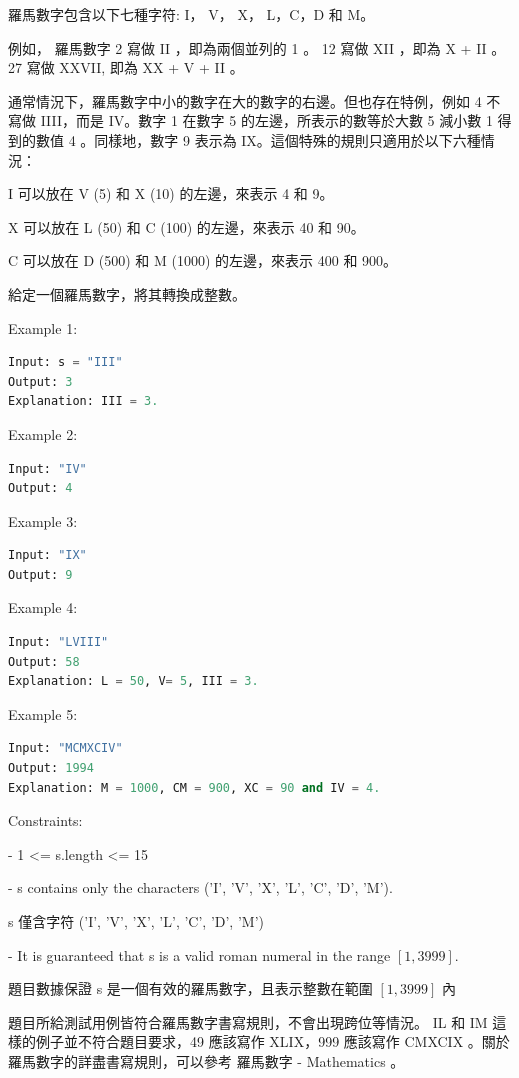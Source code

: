 \documentclass[10pt,UTF8]{ctexart}
\begin{document}
羅馬數字包含以下七種字符: I， V， X， L，C，D 和 M。

例如， 羅馬數字 2 寫做 II ，即為兩個並列的 1 。 12 寫做 XII ，即為 X + II 。 27 寫做 XXVII, 即為 XX + V + II 。

通常情況下，羅馬數字中小的數字在大的數字的右邊。但也存在特例，例如 4 不寫做 IIII，而是 IV。數字 1 在數字 5 的左邊，所表示的數等於大數 5 減小數 1 得到的數值 4 。同樣地，數字 9 表示為 IX。這個特殊的規則只適用於以下六種情況：

I 可以放在 V (5) 和 X (10) 的左邊，來表示 4 和 9。

X 可以放在 L (50) 和 C (100) 的左邊，來表示 40 和 90。

C 可以放在 D (500) 和 M (1000) 的左邊，來表示 400 和 900。

給定一個羅馬數字，將其轉換成整數。


Example 1:
\begin{lstlisting}[language={python}]
Input: s = "III"
Output: 3
Explanation: III = 3.
\end{lstlisting}

Example 2:
\begin{lstlisting}[language={python}]
Input: "IV"
Output: 4
\end{lstlisting}

Example 3:
\begin{lstlisting}[language={python}]
Input: "IX"
Output: 9
\end{lstlisting}

Example 4:
\begin{lstlisting}[language={python}]
Input: "LVIII"
Output: 58
Explanation: L = 50, V= 5, III = 3.
\end{lstlisting}

Example 5:
\begin{lstlisting}[language={python}]
Input: "MCMXCIV"
Output: 1994
Explanation: M = 1000, CM = 900, XC = 90 and IV = 4.
\end{lstlisting}

Constraints:

- 1 <= s.length <= 15

- s contains only the characters ('I', 'V', 'X', 'L', 'C', 'D', 'M').

s 僅含字符 ('I', 'V', 'X', 'L', 'C', 'D', 'M')

- It is guaranteed that s is a valid roman numeral in the range $[1, 3999]$.

題目數據保證 s 是一個有效的羅馬數字，且表示整數在範圍 $[1, 3999]$ 內

題目所給測試用例皆符合羅馬數字書寫規則，不會出現跨位等情況。 IL 和 IM 這樣的例子並不符合題目要求，49 應該寫作 XLIX，999 應該寫作 CMXCIX 。關於羅馬數字的詳盡書寫規則，可以參考 羅馬數字 - Mathematics 。
\end{document}
